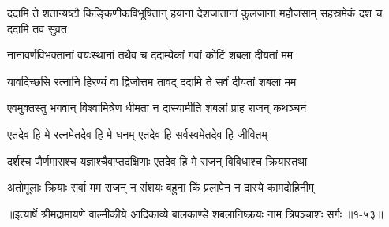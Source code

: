 \threelineshloka
{ददामि ते शतान्यष्टौ किङ्किणीकविभूषितान्}
{हयानां देशजातानां कुलजानां महौजसाम्}
{सहस्रमेकं दश च ददामि तव सुव्रत} %

\twolineshloka
{नानावर्णविभक्तानां वयःस्थानां तथैव च}
{ददाम्येकां गवां कोटिं शबला दीयतां मम} %

\twolineshloka
{यावदिच्छसि रत्नानि हिरण्यं वा द्विजोत्तम}
{तावद् ददामि ते सर्वं दीयतां शबला मम} %

\twolineshloka
{एवमुक्तस्तु भगवान् विश्वामित्रेण धीमता}
{न दास्यामीति शबलां प्राह राजन् कथञ्चन} %

\twolineshloka
{एतदेव हि मे रत्नमेतदेव हि मे धनम्}
{एतदेव हि सर्वस्वमेतदेव हि जीवितम्} %

\twolineshloka
{दर्शश्च पौर्णमासश्च यज्ञाश्चैवाप्तदक्षिणाः}
{एतदेव हि मे राजन् विविधाश्च क्रियास्तथा} %

\twolineshloka
{अतोमूलाः क्रियाः सर्वा मम राजन् न संशयः}
{बहुना किं प्रलापेन न दास्ये कामदोहिनीम्} %


॥इत्यार्षे श्रीमद्रामायणे वाल्मीकीये आदिकाव्ये बालकाण्डे शबलानिष्क्रयः नाम त्रिपञ्चाशः सर्गः ॥१-५३॥
